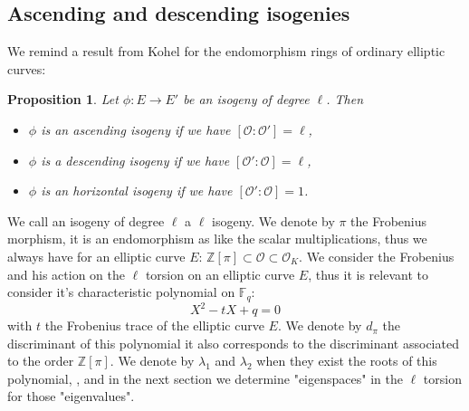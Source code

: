 \documentclass{lms}
\newtheorem{prop}[thm]{Proposition}
\begin{document}
\subsection{Ascending and descending isogenies}
We remind a result from Kohel \cite{Kohel} for the endomorphism rings of ordinary elliptic curves:
\begin{prop}
Let $\phi:E \rightarrow E'$ be an isogeny of degree $\ell$. Then 
\begin{itemize}
\item $\phi$ is an ascending isogeny if we have $[\mathcal{O}:\mathcal{O'}]=\ell$,
\item $\phi$ is a descending isogeny if we have $[\mathcal{O'}:\mathcal{O}]=\ell$,
\item $\phi$ is an horizontal isogeny if we have $[\mathcal{O'}:\mathcal{O}]=1$.
\end{itemize}
\end{prop}
We call an isogeny of degree $\ell$ a $\ell$ isogeny.
We denote by $\pi$ the Frobenius morphism, it is an endomorphism as like the scalar multiplications, thus we always have for an elliptic curve $E$:
$\mathbb{Z}[\pi] \subset \mathcal{O} \subset \mathcal{O}_K$.
We consider the Frobenius and his action on the $\ell$ torsion on an elliptic curve $E$, thus it is relevant to consider it's characteristic polynomial on $\mathbb{F}_q$:
\begin{equation}
X^2 - tX +q = 0
\end{equation}
with $t$ the Frobenius trace of the elliptic curve $E$. We denote by $d_{\pi}$ the discriminant of this polynomial it also corresponds to the discriminant associated to the order $\mathbb{Z}[\pi]$. We denote by $\lambda_1$ and $\lambda_2$ when they exist the roots of this polynomial, , and in the next section we  determine "eigenspaces" in the $\ell$ torsion for those "eigenvalues".
\end{document}
